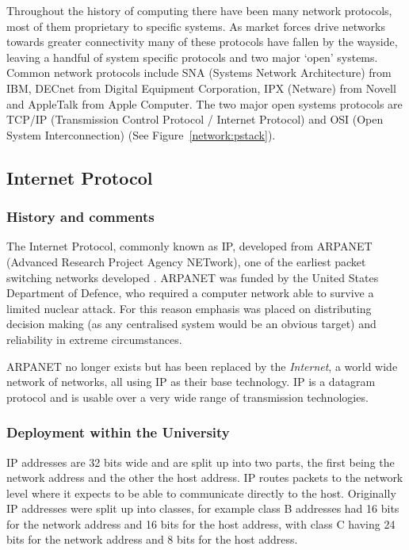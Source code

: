 Throughout the history of computing there have been many network
protocols, most of them proprietary to specific systems.  As market
forces drive networks towards greater connectivity many of these
protocols have fallen by the wayside, leaving a handful of system
specific protocols and two major `open' systems.  Common network
protocols include SNA (Systems Network Architecture) from IBM, DECnet
from Digital Equipment Corporation, IPX (Netware) from Novell and
AppleTalk from Apple Computer.  The two major open systems protocols
are TCP/IP (Transmission Control Protocol / Internet Protocol) and OSI
(Open System Interconnection) (See Figure~\ref{network:pstack}).

\subsection{Internet Protocol}
\label{network:ip}

\subsubsection{History and comments}

The Internet Protocol, commonly known as IP, developed from ARPANET
(Advanced Research Project Agency NETwork), one of the earliest packet
switching networks developed \cite{RFC:791}.  ARPANET was funded by
the United States Department of Defence, who required a computer
network able to survive a limited nuclear attack.  For this reason
emphasis was placed on distributing decision making (as any
centralised system would be an obvious target) and reliability in
extreme circumstances.

ARPANET no longer exists but has been replaced by the {\em Internet},
a world wide network of networks, all using IP as their base
technology.  IP is a datagram protocol and is usable over a very wide
range of transmission technologies.

\subsubsection{Deployment within the University}

IP addresses are 32 bits wide and are split up into two parts, the
first being the network address and the other the host address.  IP
routes packets to the network level where it expects to be able to
communicate directly to the host.  Originally IP addresses were split
up into classes, for example class B addresses had 16 bits for the
network address and 16 bits for the host address, with class C having
24 bits for the network address and 8 bits for the host address.

